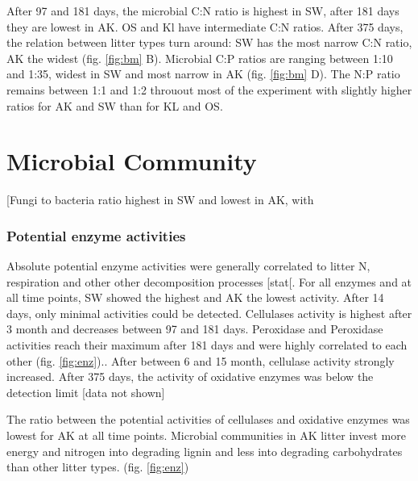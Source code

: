 After 97 and 181 days, the microbial C:N ratio is highest in SW, after 181 days they are lowest in AK. OS and Kl have intermediate C:N ratios. After 375 days, the relation between litter types turn around: SW has the most narrow C:N ratio, AK the widest (fig. \ref{fig:bm} B). Microbial C:P ratios are ranging between 1:10 and 1:35, widest in SW and most narrow in AK (fig. \ref{fig:bm} D). The N:P ratio remains between 1:1 and 1:2 throuout most of the experiment with slightly higher ratios for AK and SW than for KL and OS. 

\section{Microbial Community}
[Fungi to bacteria ratio highest in SW and lowest in AK, with 

\subsubsection{Potential enzyme activities}

Absolute potential enzyme activities were generally correlated to litter N, respiration and other other decomposition processes [stat[. For all enzymes and at all time points, SW showed the highest and AK the lowest activity. After 14 days, only minimal activities could be detected. Cellulases activity is highest after 3 month and decreases between 97 and 181 days. Peroxidase and Peroxidase activities reach their maximum after 181 days and were highly correlated to each other (fig. \ref{fig:enz}).. After between 6 and 15 month, cellulase activity strongly increased. After 375 days, the activity of oxidative enzymes was below the detection limit [data not shown]

The ratio between the potential activities of cellulases and oxidative enzymes was lowest for AK at all time points. Microbial communities in AK litter invest more energy and nitrogen into degrading lignin and less into degrading carbohydrates than other litter types. (fig. \ref{fig:enz})

% 
%  
